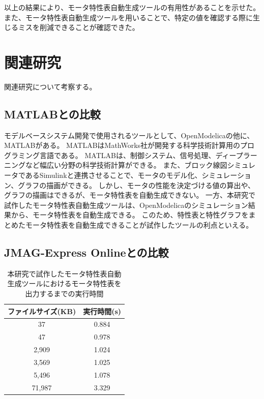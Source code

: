 以上の結果により、モータ特性表自動生成ツールの有用性があることを示せた。また、モータ特性表自動生成ツールを用いることで、特定の値を確認する際に生じるミスを削減できることが確認できた。

\section{関連研究}
関連研究について考察する。

\subsection{MATLABとの比較}
モデルベースシステム開発で使用されるツールとして、OpenModelicaの他に、MATLAB\cite{MATLAB技術30:online}がある。
MATLABはMathWorks社が開発する科学技術計算用のプログラミング言語である。
MATLABは、制御システム、信号処理、ディープラーニングなど幅広い分野の科学技術計算ができる。
また、ブロック線図シミュレータであるSimulink\cite{Simulink81:online}と連携させることで、モータのモデル化、シミュレーション、グラフの描画ができる。
しかし、モータの性能を決定づける値の算出や、グラフの描画はできるが、モータ特性表を自動生成できない。
一方、本研究で試作したモータ特性表自動生成ツールは、OpenModelicaのシミュレーション結果から、モータ特性表を自動生成できる。
このため、特性表と特性グラフをまとめたモータ特性表を自動生成できることが試作したツールの利点といえる。


\subsection{JMAG-Express Onlineとの比較}
\begin{table}[t]
	\centering
	\caption{本研究で試作したモータ特性表自動生成ツールにおけるモータ特性表を出力するまでの実行時間}
	\begin{tabular}{|c|c|} \hline
	  ファイルサイズ(KB) & 実行時間(s)\\ \hline \hline
	  37 & 0.884 \\ \hline
	  47 &  0.978\\ \hline
	  2,909 &  1.024 \\ \hline
	  3,569 & 1.025 \\ \hline
	  5,496 &  1.078\\ \hline
	  71,987 &  3.329 \\ \hline
	\end{tabular}
	\label{tab:executionTime}
  \end{table}

